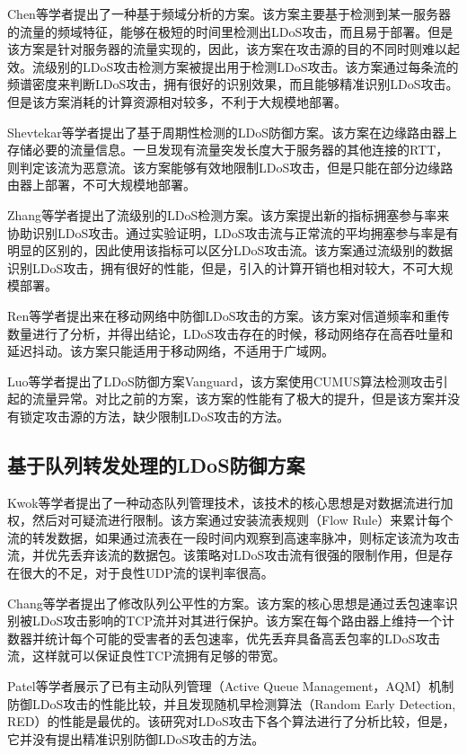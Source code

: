 Chen\cite{b3}等学者提出了一种基于频域分析的方案。该方案主要基于检测到某一服务器的流量的频域特征，能够在极短的时间里检测出LDoS攻击，而且易于部署。但是该方案是针对服务器的流量实现的，因此，该方案在攻击源的目的不同时则难以起效。流级别的LDoS攻击检测方案\cite{chen2007spectral}被提出用于检测LDoS攻击。该方案通过每条流的频谱密度来判断LDoS攻击，拥有很好的识别效果，而且能够精准识别LDoS攻击。但是该方案消耗的计算资源相对较多，不利于大规模地部署。

Shevtekar\cite{shevtekar2005low}等学者提出了基于周期性检测的LDoS防御方案。该方案在边缘路由器上存储必要的流量信息。一旦发现有流量突发长度大于服务器的其他连接的RTT，则判定该流为恶意流。该方案能够有效地限制LDoS攻击，但是只能在部分边缘路由器上部署，不可大规模地部署。

Zhang\cite{b1}等学者提出了流级别的LDoS检测方案。该方案提出新的指标拥塞参与率来协助识别LDoS攻击。通过实验证明，LDoS攻击流与正常流的平均拥塞参与率是有明显的区别的，因此使用该指标可以区分LDoS攻击流。该方案通过流级别的数据识别LDoS攻击，拥有很好的性能，但是，引入的计算开销也相对较大，不可大规模部署。

Ren\cite{ren2007pulsing}等学者提出来在移动网络中防御LDoS攻击的方案。该方案对信道频率和重传数量进行了分析，并得出结论，LDoS攻击存在的时候，移动网络存在高吞吐量和延迟抖动。该方案只能适用于移动网络，不适用于广域网。

Luo\cite{luo2009detecting}等学者提出了LDoS防御方案Vanguard，该方案使用CUMUS算法检测攻击引起的流量异常。对比之前的方案，该方案的性能有了极大的提升，但是该方案并没有锁定攻击源的方法，缺少限制LDoS攻击的方法。

\subsection{基于队列转发处理的LDoS防御方案}
\label{chap2:queanalysis}
Kwok\cite{b22}等学者提出了一种动态队列管理技术，该技术的核心思想是对数据流进行加权，然后对可疑流进行限制。该方案通过安装流表规则（Flow Rule）来累计每个流的转发数据，如果通过流表在一段时间内观察到高速率脉冲，则标定该流为攻击流，并优先丢弃该流的数据包。该策略对LDoS攻击流有很强的限制作用，但是存在很大的不足，对于良性UDP流的误判率很高。

Chang\cite{b8}等学者提出了修改队列公平性的方案。该方案的核心思想是通过丢包速率识别被LDoS攻击影响的TCP流并对其进行保护。该方案在每个路由器上维持一个计数器并统计每个可能的受害者的丢包速率，优先丢弃具备高丢包率的LDoS攻击流，这样就可以保证良性TCP流拥有足够的带宽。

Patel\cite{patel2016throughput}等学者展示了已有主动队列管理（Active Queue Management，AQM）机制防御LDoS攻击的性能比较，并且发现随机早检测算法（Random Early Detection, RED）的性能是最优的。该研究对LDoS攻击下各个算法进行了分析比较，但是，它并没有提出精准识别防御LDoS攻击的方法。



